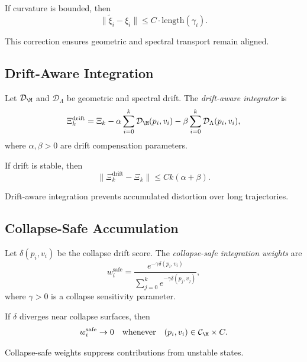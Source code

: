 \begin{lemma}
If curvature is bounded, then
\[
\| \tilde{\xi}_i - \xi_i \|
\le C \cdot \mathrm{length}(\gamma_i).
\]
\end{lemma}

\begin{remark}
This correction ensures geometric and spectral transport remain aligned.
\end{remark}

\subsection{Drift-Aware Integration}

\begin{definition}
Let $\mathcal{D}_\M$ and $\mathcal{D}_\Lambda$ be geometric and spectral drift.
The \emph{drift-aware integrator} is
\[
\Xi_k^\mathrm{drift}
= \Xi_k
- \alpha \sum_{i=0}^k \mathcal{D}_\M(p_i,v_i)
- \beta \sum_{i=0}^k \mathcal{D}_\Lambda(p_i,v_i),
\]
where $\alpha,\beta > 0$ are drift compensation parameters.
\end{definition}

\begin{lemma}
If drift is stable, then
\[
\| \Xi_k^\mathrm{drift} - \Xi_k \|
\le C k (\alpha + \beta).
\]
\end{lemma}

\begin{remark}
Drift-aware integration prevents accumulated distortion over long
trajectories.
\end{remark}

\subsection{Collapse-Safe Accumulation}

\begin{definition}
Let $\delta(p_i,v_i)$ be the collapse drift score.  
The \emph{collapse-safe integration weights} are
\[
w_i^\mathrm{safe}
= \frac{e^{-\gamma \delta(p_i,v_i)}}{\sum_{j=0}^k e^{-\gamma \delta(p_j,v_j)}},
\]
where $\gamma > 0$ is a collapse sensitivity parameter.
\end{definition}

\begin{lemma}
If $\delta$ diverges near collapse surfaces, then
\[
w_i^\mathrm{safe} \to 0
\quad\text{whenever}\quad (p_i,v_i) \in \mathcal{C}_\M \times C.
\]
\end{lemma}

\begin{remark}
Collapse-safe weights suppress contributions from unstable states.
\end{remark}

